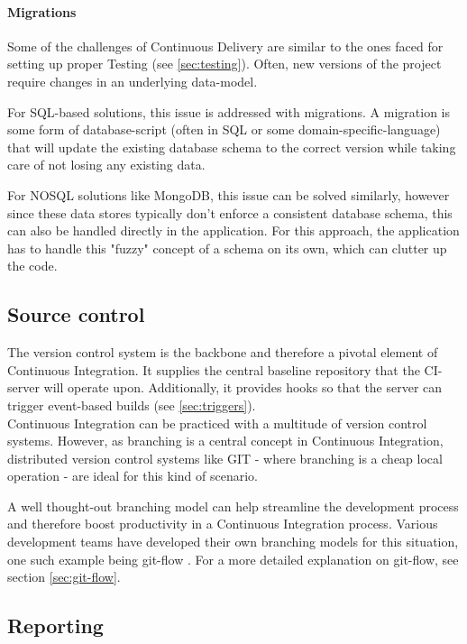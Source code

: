 \paragraph{Migrations}\label{sec:migrations}

Some of the challenges of Continuous Delivery are similar to the ones faced for
setting up proper Testing (see \ref{sec:testing}). Often, new versions of the
project require changes in an underlying data-model. 

For SQL-based solutions, this issue is addressed with migrations. A migration is
some form of database-script (often in SQL or some domain-specific-language)
that will update the existing database schema to the correct version while
taking care of not losing any existing data.

For NOSQL solutions like MongoDB, this issue can be solved similarly, however
since these data stores typically don't enforce a consistent database schema,
this can also be handled directly in the application. For this approach, the
application has to handle this "fuzzy" concept of a schema on its own, which can
clutter up the code.

\subsection{Source control}\label{sec:source-control}

The version control system is the backbone and therefore a pivotal element of
Continuous Integration. It supplies the central baseline repository that the
CI-server will operate upon. Additionally, it provides hooks so that the server
can trigger event-based builds (see \ref{sec:triggers}).\\

Continuous Integration can be practiced with a multitude of version control
systems. However, as branching is a central concept in Continuous Integration,
distributed version control systems like GIT - where branching is a cheap local
operation - are ideal for this kind of scenario.

A well thought-out branching model can help streamline the development process
and therefore boost productivity in a Continuous Integration process. Various
development teams have developed their own branching models for this situation,
one such example being git-flow \cite{driessen:2010}. For a more detailed
explanation on git-flow, see section \ref{sec:git-flow}.

\subsection{Reporting}\label{sec:reporting}

